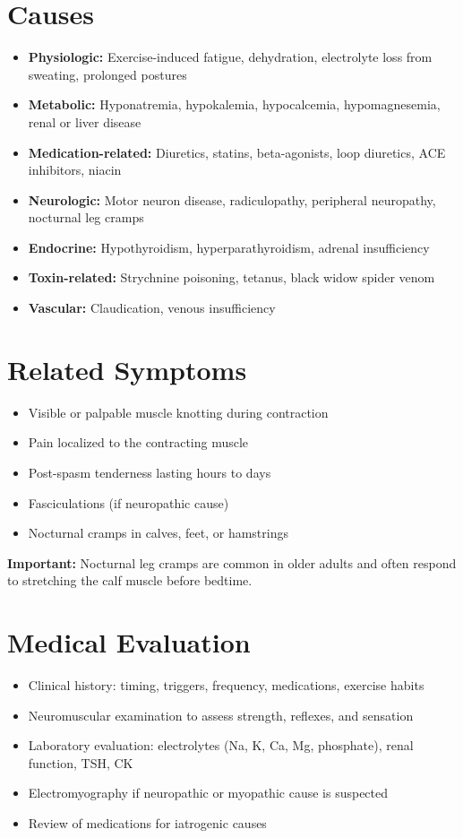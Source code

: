\section*{Causes}
\begin{itemize}
  \item \textbf{Physiologic:} Exercise-induced fatigue, dehydration, electrolyte loss from sweating, prolonged postures
  \item \textbf{Metabolic:} Hyponatremia, hypokalemia, hypocalcemia, hypomagnesemia, renal or liver disease
  \item \textbf{Medication-related:} Diuretics, statins, beta-agonists, loop diuretics, ACE inhibitors, niacin
  \item \textbf{Neurologic:} Motor neuron disease, radiculopathy, peripheral neuropathy, nocturnal leg cramps
  \item \textbf{Endocrine:} Hypothyroidism, hyperparathyroidism, adrenal insufficiency
  \item \textbf{Toxin-related:} Strychnine poisoning, tetanus, black widow spider venom
  \item \textbf{Vascular:} Claudication, venous insufficiency
\end{itemize}

\section*{Related Symptoms}
\begin{itemize}
  \item Visible or palpable muscle knotting during contraction
  \item Pain localized to the contracting muscle
  \item Post-spasm tenderness lasting hours to days
  \item Fasciculations (if neuropathic cause)
  \item Nocturnal cramps in calves, feet, or hamstrings
\end{itemize}
\textbf{Important:} Nocturnal leg cramps are common in older adults and often respond to stretching the calf muscle before bedtime.

\section*{Medical Evaluation}
\begin{itemize}
  \item Clinical history: timing, triggers, frequency, medications, exercise habits
  \item Neuromuscular examination to assess strength, reflexes, and sensation
  \item Laboratory evaluation: electrolytes (Na, K, Ca, Mg, phosphate), renal function, TSH, CK
  \item Electromyography if neuropathic or myopathic cause is suspected
  \item Review of medications for iatrogenic causes
\end{itemize}

